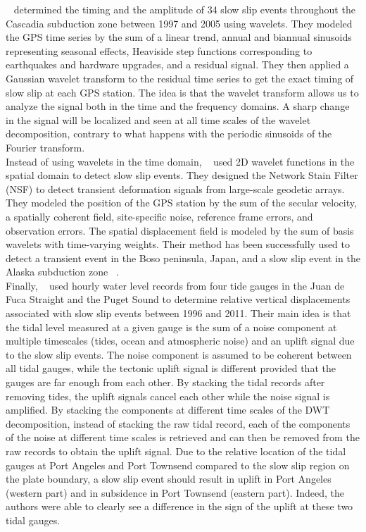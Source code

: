 \documentclass{article}
\begin{document}
~\citet{SZE_2008} determined the timing and the amplitude of 34 slow slip events throughout the Cascadia subduction zone between 1997 and 2005 using wavelets. They modeled the GPS time series by the sum of a linear trend, annual and biannual sinusoids representing seasonal effects, Heaviside step functions corresponding to earthquakes and hardware upgrades, and a residual signal. They then applied a Gaussian wavelet transform to the residual time series to get the exact timing of slow slip at each GPS station. The idea is that the wavelet transform allows us to analyze the signal both in the time and the frequency domains. A sharp change in the signal will be localized and seen at all time scales of the wavelet decomposition, contrary to what happens with the periodic sinusoids of the Fourier transform. \\

Instead of using wavelets in the time domain, ~\citet{OHT_2010} used 2D wavelet functions in the spatial domain to detect slow slip events. They designed the Network Stain Filter (NSF) to detect transient deformation signals from large-scale geodetic arrays. They modeled the position of the GPS station by the sum of the secular velocity, a spatially coherent field, site-specific noise, reference frame errors, and observation errors. The spatial displacement field is modeled by the sum of basis wavelets with time-varying weights.  Their method has been successfully used to detect a transient event in the Boso peninsula, Japan, and a slow slip event in the Alaska subduction zone ~\citep{WEI_2012}. \\

Finally, ~\citet{ALB_2019} used hourly water level records from four tide gauges in the Juan de Fuca Straight and the Puget Sound to determine relative vertical displacements associated with slow slip events between 1996 and 2011. Their main idea is that the tidal level measured at a given gauge is the sum of a noise component at multiple timescales (tides, ocean and atmospheric noise) and an uplift signal due to the slow slip events. The noise component is assumed to be coherent between all tidal gauges, while the tectonic uplift signal is different provided that the gauges are far enough from each other. By stacking the tidal records after removing tides, the uplift signals cancel each other while the noise signal is amplified. By stacking the components at different time scales of the DWT decomposition, instead of stacking the raw tidal record, each of the components of the noise at different time scales is retrieved and can then be removed from the raw records to obtain the uplift signal. Due to the relative location of the tidal gauges at Port Angeles and Port Townsend compared to the slow slip region on the plate boundary, a slow slip event should result in uplift in Port Angeles (western part) and in subsidence in Port Townsend (eastern part). Indeed, the authors were able to clearly see a difference in the sign of the uplift at these two tidal gauges. \\
\end{document}

